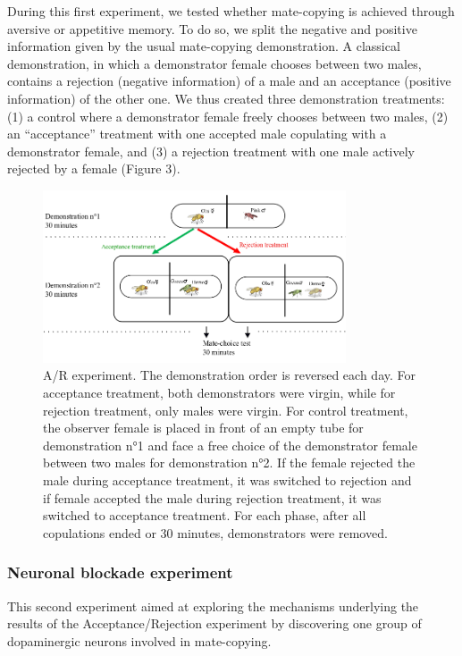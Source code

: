 \documentclass[a4paper, 12pt]{article}
\begin{document}
	During this first experiment, we tested whether mate-copying is achieved through aversive or appetitive memory. To do so, we split the negative and positive information given by the usual mate-copying demonstration. A classical demonstration, in which a demonstrator female chooses between two males, contains a rejection (negative information) of a male and an acceptance (positive information) of the other one. We thus created three demonstration treatments: (1) a control where a demonstrator female freely chooses between two males, (2) an “acceptance” treatment with one accepted male copulating with a demonstrator female, and (3) a rejection treatment with one male actively rejected by a female (Figure 3).
	
		\begin{figure}[h]
		\centering
		\includegraphics[width=0.8\textwidth]{images/ar}
		\caption{A/R experiment. 
			The demonstration order is reversed each day. For acceptance treatment, both demonstrators were virgin, while for rejection treatment, only males were virgin. For control treatment, the observer female is placed in front of an empty tube for demonstration n°1 and face a free choice of the demonstrator female between two males for demonstration n°2. If the female rejected the male during acceptance treatment, it was switched to rejection and if female accepted the male during rejection treatment, it was switched to acceptance treatment. For each phase, after all copulations ended or 30 minutes, demonstrators were removed.}
		\label{fig:ar}
	\end{figure}
	
	\subsubsection{Neuronal blockade experiment}
	
	This second experiment aimed at exploring the mechanisms underlying the results of the Acceptance/Rejection experiment by discovering one group of dopaminergic neurons involved in mate-copying.
	
\end{document}
